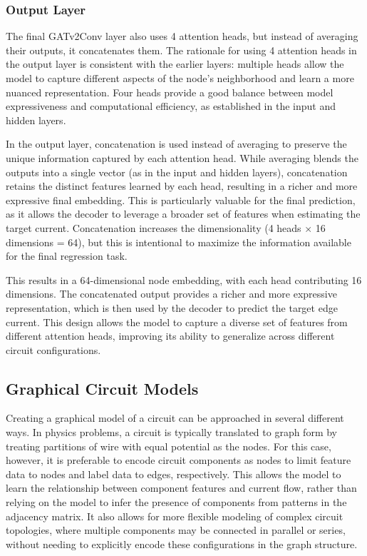 \documentclass[10pt,twocolumn,letterpaper]{article}
\begin{document}
\subsubsection{Output Layer}
\label{subsubsec:output_layer}

The final GATv2Conv layer also uses 4 attention heads, but instead of averaging their outputs, it concatenates them. The rationale for using 4 attention heads in the output layer is consistent with the earlier layers: multiple heads allow the model to capture different aspects of the node's neighborhood and learn a more nuanced representation. Four heads provide a good balance between model expressiveness and computational efficiency, as established in the input and hidden layers.

In the output layer, concatenation is used instead of averaging to preserve the unique information captured by each attention head. While averaging blends the outputs into a single vector (as in the input and hidden layers), concatenation retains the distinct features learned by each head, resulting in a richer and more expressive final embedding. This is particularly valuable for the final prediction, as it allows the decoder to leverage a broader set of features when estimating the target current. Concatenation increases the dimensionality (4 heads $\times$ 16 dimensions = 64), but this is intentional to maximize the information available for the final regression task.

This results in a 64-dimensional node embedding, with each head contributing 16 dimensions. The concatenated output provides a richer and more expressive representation, which is then used by the decoder to predict the target edge current. This design allows the model to capture a diverse set of features from different attention heads, improving its ability to generalize across different circuit configurations.\\

\subsection{Graphical Circuit Models}
\label{subsec:graphical_models}

Creating a graphical model of a circuit can be approached in several different ways.
In physics problems, a circuit is typically translated to graph form by treating partitions of wire with equal potential as the nodes.
For this case, however, it is preferable to encode circuit components as nodes to limit feature data to nodes and label data to edges, respectively. This allows the model to learn the relationship between component features and current flow, rather than relying on the model to infer the presence of components from patterns in the adjacency matrix. It also allows for more flexible modeling of complex circuit topologies, where multiple components may be connected in parallel or series, without needing to explicitly encode these configurations in the graph structure.
\end{document}
